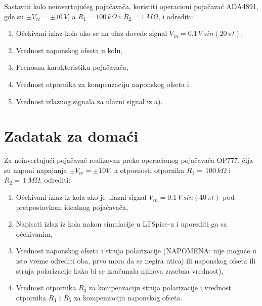 \begin{zadatak}
    Sastaviti kolo neinvertujućeg pojačavača, koristiti operacioni pojačavač ADA4891, gde su $\pm V_{cc}=\pm10\,V$, a $R_1 = 100 \,k\Omega$ i $R_2 = 1 \,M\Omega$, i odrediti:
    
    \begin{enumerate}
        \item [a)] Očekivani izlaz kola ako se na ulaz dovede signal $V_{in} = 0.1\,V\,sin(20\,\pi t)$,
        \item [b)] Vrednost naponskog ofseta u kolu,
        \item [c)] Prenosnu karakteristiku pojačavača,
        \item [d)] Vrednost otpornika za kompenzaciju naponskog ofseta i
        \item [e)] Vrednost izlaznog signala za ulazni signal iz a).
    \end{enumerate}
\end{zadatak}

\pagebreak
\section{Zadatak za domaći}

\begin{zadatak}
    Za neinvertujući pojačavač realizovan preko operacionog pojačavača OP777, čija su naponi napajanja $\pm V_{cc} = \pm 10 V$, a otpornosti otpornika $R_1 = \,100\,k\Omega$ i $R_2 = \,1\,M\Omega$, odrediti:
    \begin{enumerate}
        \item [a)] Očekivani izlaz iz kola ako je ulazni signal $V_{in} = 0.1\,V \,sin(40\,\pi t)$ pod pretpostavkom idealnog pojačavača,
        \item [b)] Napisati izlaz iz kola nakon simulacije u LTSpice-u i uporediti ga sa očekivanim,
        \item [c)] Vrednost naponskog ofseta i struja polarizacije (NAPOMENA: nije moguće u isto vreme odrediti oba, prvo mora da se negira uticaj ili naponskog ofseta ili struja polarizacije kako bi se izračunala njihova zasebna vrednost),
        \item [d)] Vrednost otpornika $R_3$ za kompenzaciju struja polarizacije i vrednost otpornika $R_4$ i $R_5$ za kompenzaciju naponskog ofseta.
    \end{enumerate}
\end{zadatak}